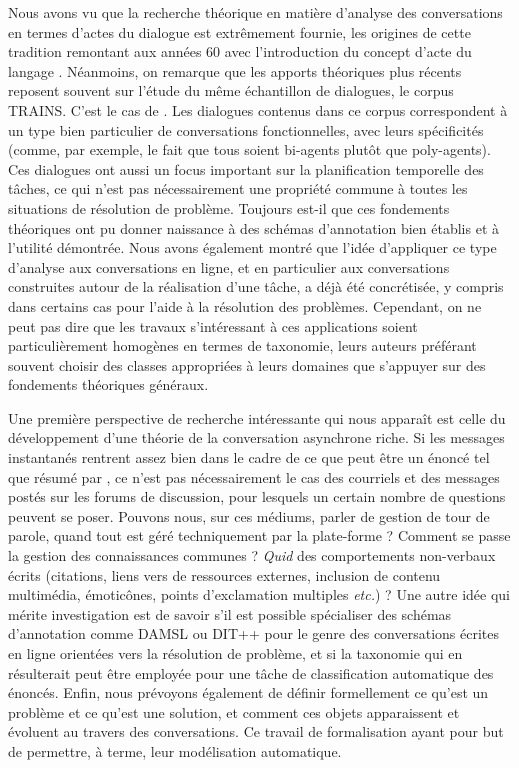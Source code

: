 \documentclass[10pt,a4paper,twoside]{article}
\begin{document}
Nous avons vu que la recherche théorique en matière d'analyse des conversations en termes d'actes du dialogue est extrêmement fournie, les origines de cette tradition remontant aux années 60 avec l'introduction du concept d'acte du langage \cite{austin1975how, searle1969speech}. Néanmoins, on remarque que les apports théoriques plus récents reposent souvent sur l'étude du même échantillon de dialogues, le corpus TRAINS. C'est le cas de \citet{traum1992conversation, poesio1998towards, core1997coding, bunt2009dit++}. Les dialogues contenus dans ce corpus correspondent à un type bien particulier de conversations fonctionnelles, avec leurs spécificités (comme, par exemple, le fait que tous soient bi-agents plutôt que poly-agents). Ces dialogues ont aussi un focus important sur la planification temporelle des tâches, ce qui n'est pas nécessairement une propriété commune à toutes les situations de résolution de problème. Toujours est-il que ces fondements théoriques ont pu donner naissance à des schémas d'annotation bien établis et à l'utilité démontrée. Nous avons également montré que l'idée d'appliquer ce type d'analyse aux conversations en ligne, et en particulier aux conversations construites autour de la réalisation d'une tâche, a déjà été concrétisée, y compris dans certains cas pour l'aide à la résolution des problèmes. Cependant, on ne peut pas dire que les travaux s'intéressant à ces applications soient particulièrement homogènes en termes de taxonomie, leurs auteurs préférant souvent choisir des classes appropriées à leurs domaines que s'appuyer sur des fondements théoriques généraux.

Une première perspective de recherche intéressante qui nous apparaît est celle du développement d'une théorie de la conversation asynchrone riche. Si les messages instantanés rentrent assez bien dans le cadre de ce que peut être un énoncé tel que résumé par \citet{popescu2005dialogue}, ce n'est pas nécessairement le cas des courriels et des messages postés sur les forums de discussion, pour lesquels un certain nombre de questions peuvent se poser. Pouvons nous, sur ces médiums, parler de gestion de tour de parole, quand tout est géré techniquement par la plate-forme ? Comment se passe la gestion des connaissances communes ? \textit{Quid} des comportements non-verbaux écrits (citations, liens vers de ressources externes, inclusion de contenu multimédia, émoticônes, points d'exclamation multiples \textit{etc.}) ? Une autre idée qui mérite investigation est de savoir s'il est possible spécialiser des schémas d'annotation comme DAMSL ou DIT++ pour le genre des conversations écrites en ligne orientées vers la résolution de problème, et si la taxonomie qui en résulterait peut être employée pour une tâche de classification automatique des énoncés. Enfin, nous prévoyons également de définir formellement ce qu'est un problème et ce qu'est une solution, et comment ces objets apparaissent et évoluent au travers des conversations. Ce travail de formalisation ayant pour but de permettre, à terme, leur modélisation automatique.




\end{document}
